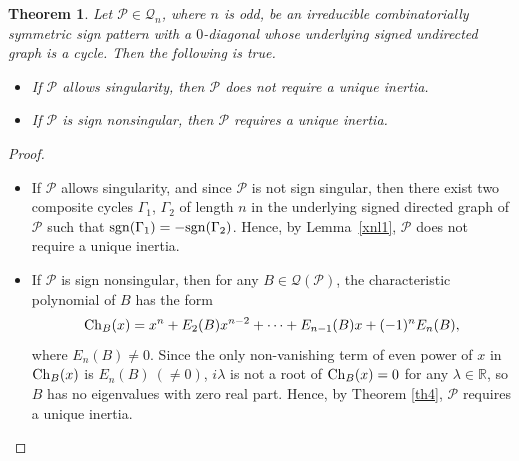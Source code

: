 \documentclass[a4paper, 10pt]{article}
\newtheorem{theorem}{Theorem}[section]
\numberwithin{equation}{section}
\def\det{{\rm det}}
\def\sgn{{\rm sgn}}
\def\Ch{{\rm Ch}}
\begin{document}
\begin{theorem}\label{nth0.11}
	Let $\mathcal{P}\in \mathcal{Q}_n$, where $n$ is odd, be an irreducible combinatorially symmetric sign pattern with a $0$-diagonal whose underlying signed undirected graph is a cycle. Then the following is true.
	\begin{itemize}
		\item[i.] If $\mathcal{P}$ allows singularity, then $\mathcal{P}$ does not require a unique inertia.
		\item[ii.] If $\mathcal{P}$ is sign nonsingular, then $\mathcal{P}$ requires a unique inertia. 
	\end{itemize}
\end{theorem}
\begin{proof}
	\begin{itemize}
		\item[i.] If $\mathcal{P}$ allows singularity, and since $\mathcal{P}$ is not sign singular, then there exist two composite cycles $\Gamma_1$, $\Gamma_2$ of length $n$ in the underlying signed directed graph of $\mathcal{P}$ such that $\sgn(\Gamma_1) = -\sgn(\Gamma_2)$.
		Hence, by Lemma~\ref{xnl1}, $\mathcal{P}$ does not require a unique inertia.
		\item[ii.] If $\mathcal{P}$ is sign nonsingular, then for any $B\in \mathcal{Q}(\mathcal{P})$, the characteristic polynomial of $B$ has the form $$\Ch_B(x)=x^n+E_2(B)x^{n-2}+\cdots+E_{n-1}(B)x+(-1)^nE_n(B),$$ where $E_n(B)\neq 0$. Since the only non-vanishing term of even power of $x$ in $\Ch_B(x)$ is $E_n(B)~(\neq 0)$, $i\lambda$ is not a root of $\Ch_B(x)=0$ for any $\lambda\in\mathbb{R}$, so $B$ has no eigenvalues with zero real part. Hence, by Theorem \ref{th4}, $\mathcal{P}$ requires a unique inertia.
	\end{itemize}
\end{proof}
\end{document}
